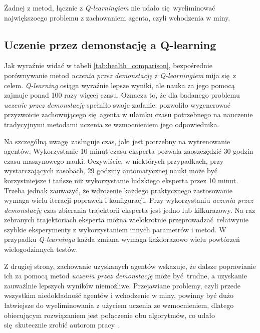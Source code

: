 Żadnej z metod, łącznie z \textit{Q-learningiem} nie udało się wyeliminować największoego problemu z zachowaniem agenta, czyli wchodzenia w miny.

\subsection{Uczenie przez demonstację a Q-learning}

Jak wyraźnie widać w tabeli \ref{tab:health_comparison}, bezpośrednie porównywanie metod \textit{uczenia przez demonstację} z \textit{Q-learningiem} mija się z celem. \textit{Q-learning} osiąga wyraźnie lepsze wyniki, ale nauka za jego pomocą zajmuje ponad 100 razy więcej czasu. Oznacza to, że dla badanego problemu \textit{uczenie przez demonstację} spełniło swoje zadanie: pozwoliło wygenerować przyzwoicie zachowującego się agenta w ułamku czasu potrzebnego na nauczenie tradycyjnymi metodami uczenia ze wzmocnieniem jego odpowiednika.

Na szczególną uwagę zasługuje czas, jaki jest potrzebny na wytrenowanie agentów. Wykorzystanie 10 minut czasu eksperta pozwala zaoszczędzić 30 godzin czasu maszynowego nauki. Oczywiście, w niektórych przypadkach, przy wystarczających zasobach, 29 godziny automatycznej nauki może być korzystniejsze i tańsze niż wykorzystanie ludzkiego eksperta przez 10 minut. Trzeba jednak zauważyć, że wdrożenie każdego praktycznego zastosowanie wymaga wielu iteracji poprawek i konfiguracji. Przy wykorzystaniu \textit{uczenia przez demonstację} czas zbierania trajektorii eksperta jest jedno lub kilkurazowy. Na raz zebranych trajektoriach eksperta można wielokrotnie przeprowadzać relatwynie szybkie eksperymenty z wykorzystaniem innych parametrów i metod. W przypadku \textit{Q-learningu} każda zmiana wymaga każdorazowo wielu powtórzeń wielogodzinnych testów.

Z drugiej strony, zachowanie uzyskanych agentów wskazuje, że dalsze poprawianie ich za pomocą metod \textit{uczenia przez demonstację} może być trudne, a uzyskanie zauważlnie lepszych wyników niemożliwe. Przejawiane problemy, czyli przede wszystkim niedokładność agentów i wchodzenie w miny, powinny być dużo łatwiejsze do wyeliminowania z użyciem uczenia ze wzmocnieniem, dlatego obiecującym rozwiązaniem jest połączenie obu algorytmów, co udało się skutecznie zrobić autorom pracy \cite{DBLP:journals/corr/HesterVPLSPSDOA17}.


